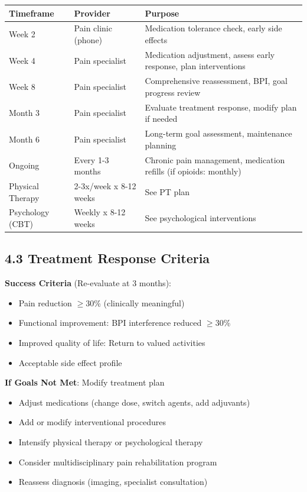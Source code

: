 \documentclass[11pt,letterpaper]{article}
\begin{document}
\begin{longtable}{|l|l|X|}
\hline
\textbf{Timeframe} & \textbf{Provider} & \textbf{Purpose} \\ \hline
Week 2 & Pain clinic (phone) & Medication tolerance check, early side effects \\ \hline
Week 4 & Pain specialist & Medication adjustment, assess early response, plan interventions \\ \hline
Week 8 & Pain specialist & Comprehensive reassessment, BPI, goal progress review \\ \hline
Month 3 & Pain specialist & Evaluate treatment response, modify plan if needed \\ \hline
Month 6 & Pain specialist & Long-term goal assessment, maintenance planning \\ \hline
Ongoing & Every 1-3 months & Chronic pain management, medication refills (if opioids: monthly) \\ \hline
Physical Therapy & 2-3x/week x 8-12 weeks & See PT plan \\ \hline
Psychology (CBT) & Weekly x 8-12 weeks & See psychological interventions \\ \hline
\end{longtable}

\subsection*{4.3 Treatment Response Criteria}

\textbf{Success Criteria} (Re-evaluate at 3 months):
\begin{itemize}[leftmargin=*]
    \item Pain reduction $\geq$30\% (clinically meaningful)
    \item Functional improvement: BPI interference reduced $\geq$30\%
    \item Improved quality of life: Return to valued activities
    \item Acceptable side effect profile
\end{itemize}

\textbf{If Goals Not Met}: Modify treatment plan
\begin{itemize}[leftmargin=*]
    \item Adjust medications (change dose, switch agents, add adjuvants)
    \item Add or modify interventional procedures
    \item Intensify physical therapy or psychological therapy
    \item Consider multidisciplinary pain rehabilitation program
    \item Reassess diagnosis (imaging, specialist consultation)
\end{itemize}
\end{document}
